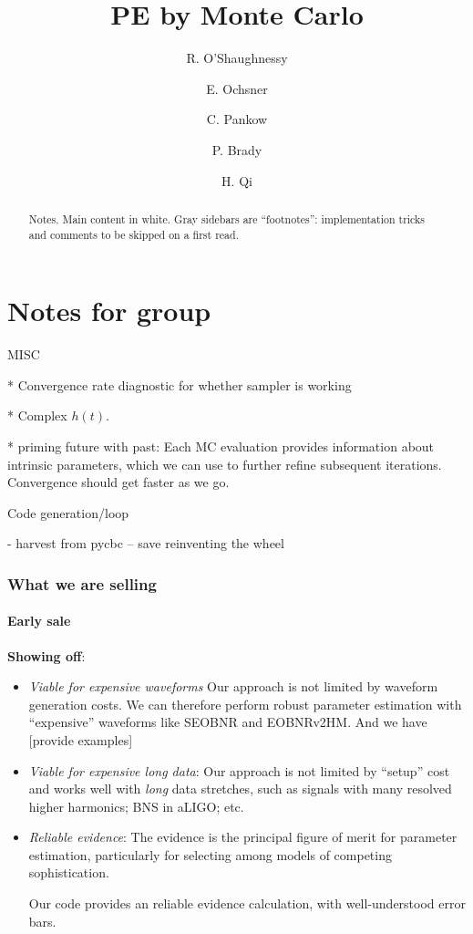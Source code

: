 \documentclass[twocolumn,prd,nofootinbib]{revtex4}
\newcommand\editremark[1]{{\color{red} #1}}
\begin{document}
\title{PE by Monte Carlo}
\author{R. O'Shaughnessy}
\author{E. Ochsner}
\author{C. Pankow}
\author{P. Brady}
\author{H. Qi}
\begin{abstract}
Notes. Main content in white.  Gray sidebars are ``footnotes'': implementation tricks and comments to be skipped on a
first read.
\end{abstract}
\maketitle
\tableofcontents
\part{Notes for group}
\nocite{gwastro-HarryFairhurst-CoherentTargetedSearch}


\editremark{MISC}

* Convergence rate diagnostic for whether sampler is working

* Complex $h(t)$.

* \editremark{priming future with past}: Each MC evaluation provides information about intrinsic parameters, which we can use
to further refine subsequent iterations.  Convergence should get faster as we go.

\editremark{Code generation/loop}

- harvest from pycbc -- save reinventing the wheel

\section{What we are selling}

\subsection{Early sale}

\noindent \textbf{Showing off}:
\begin{itemize}
\item \emph{Viable for expensive waveforms} Our approach is not limited by waveform generation costs.  We can therefore perform
robust parameter estimation with ``expensive'' waveforms like SEOBNR and EOBNRv2HM.  And we have [provide examples]

\item \emph{Viable for expensive long data}: Our approach is not limited by ``setup'' cost and works well with \emph{long} data
  stretches, such as signals with many resolved higher harmonics; BNS in aLIGO; etc.

\item \emph{Reliable evidence}: The evidence is the principal figure of merit for parameter estimation,
particularly for selecting among models of competing sophistication.   

Our code provides an  reliable evidence calculation, with well-understood error bars.
\end{itemize}
\end{document}
